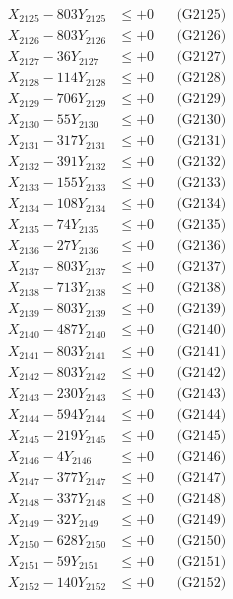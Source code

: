 \documentclass[a4paper,10pt]{article}
\begin{document}
{\begin{align}
X_{2125} - 803Y_{2125} &\leq +0 && \text{(G2125)} \\
X_{2126} - 803Y_{2126} &\leq +0 && \text{(G2126)} \\
X_{2127} - 36Y_{2127} &\leq +0 && \text{(G2127)} \\
X_{2128} - 114Y_{2128} &\leq +0 && \text{(G2128)} \\
X_{2129} - 706Y_{2129} &\leq +0 && \text{(G2129)} \\
X_{2130} - 55Y_{2130} &\leq +0 && \text{(G2130)} \\
\allowbreak
X_{2131} - 317Y_{2131} &\leq +0 && \text{(G2131)} \\
X_{2132} - 391Y_{2132} &\leq +0 && \text{(G2132)} \\
X_{2133} - 155Y_{2133} &\leq +0 && \text{(G2133)} \\
X_{2134} - 108Y_{2134} &\leq +0 && \text{(G2134)} \\
X_{2135} - 74Y_{2135} &\leq +0 && \text{(G2135)} \\
X_{2136} - 27Y_{2136} &\leq +0 && \text{(G2136)} \\
X_{2137} - 803Y_{2137} &\leq +0 && \text{(G2137)} \\
X_{2138} - 713Y_{2138} &\leq +0 && \text{(G2138)} \\
X_{2139} - 803Y_{2139} &\leq +0 && \text{(G2139)} \\
X_{2140} - 487Y_{2140} &\leq +0 && \text{(G2140)} \\
\allowbreak
X_{2141} - 803Y_{2141} &\leq +0 && \text{(G2141)} \\
X_{2142} - 803Y_{2142} &\leq +0 && \text{(G2142)} \\
X_{2143} - 230Y_{2143} &\leq +0 && \text{(G2143)} \\
X_{2144} - 594Y_{2144} &\leq +0 && \text{(G2144)} \\
X_{2145} - 219Y_{2145} &\leq +0 && \text{(G2145)} \\
X_{2146} - 4Y_{2146} &\leq +0 && \text{(G2146)} \\
X_{2147} - 377Y_{2147} &\leq +0 && \text{(G2147)} \\
X_{2148} - 337Y_{2148} &\leq +0 && \text{(G2148)} \\
X_{2149} - 32Y_{2149} &\leq +0 && \text{(G2149)} \\
X_{2150} - 628Y_{2150} &\leq +0 && \text{(G2150)} \\
\allowbreak
X_{2151} - 59Y_{2151} &\leq +0 && \text{(G2151)} \\
X_{2152} - 140Y_{2152} &\leq +0 && \text{(G2152)} \\

\end{align}}
\end{document}
